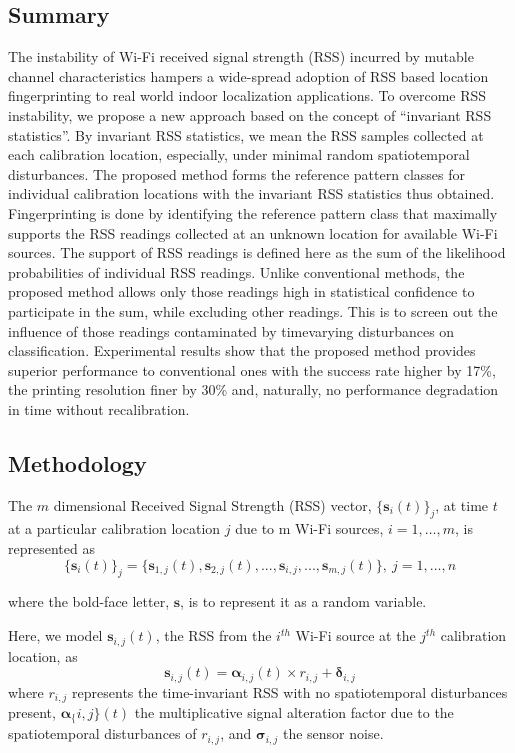 \documentclass{ieeeaccess}
\begin{document}
\subsection{Summary}
The instability of Wi-Fi received signal strength (RSS) incurred
by mutable channel characteristics hampers a wide-spread
adoption of RSS based location fingerprinting to real world indoor
localization applications. To overcome RSS instability, we
propose a new approach based on the concept of “invariant RSS
statistics”. By invariant RSS statistics, we mean the RSS samples
collected at each calibration location, especially, under minimal
random spatiotemporal disturbances. The proposed method\cite{Husen:2016:HPI:2857546.2857589} forms
the reference pattern classes for individual calibration locations
with the invariant RSS statistics thus obtained. Fingerprinting is
done by identifying the reference pattern class that maximally
supports the RSS readings collected at an unknown location for
available Wi-Fi sources. The support of RSS readings is defined
here as the sum of the likelihood probabilities of individual RSS
readings. Unlike conventional methods, the proposed method
allows only those readings high in statistical confidence to
participate in the sum, while excluding other readings. This is to
screen out the influence of those readings contaminated by timevarying disturbances on classification. Experimental results show
that the proposed method provides superior performance to
conventional ones with the success rate higher by 17\%, the
printing resolution finer by 30\% and, naturally, no performance
degradation in time without recalibration.

\subsection{Methodology}
The $m$ dimensional Received Signal Strength (RSS) vector,
$\{\mathbf{s}_i(t)\}_j$, at time $t$ at a particular calibration location $j$ due to m Wi-Fi sources, $i=1, …, m$, is represented as
\begin{equation}
\{\mathbf{s}_i(t)\}_j=\{\mathbf{s}_{1,j}(t), \mathbf{s}_{2,j}(t),...,\mathbf{s}_{i,j},...,\mathbf{s}_{m,j}(t)\},\ j=1,...,n
\end{equation}

where the bold-face letter, $\mathbf{s}$, is to represent it as a random
variable.

Here, we model $\mathbf{s}_{i,j}(t)$, the RSS from the $i^{th}$ Wi-Fi source at the $j^{th}$
calibration location, as
\begin{equation}
\mathbf{s}_{i,j}(t)=\bm{\alpha}_{i,j}(t)\times r_{i,j}+\bm{\delta}_{i,j}
\end{equation}
where $r_{i,j}$ represents the time-invariant RSS with no
spatiotemporal disturbances present, $\bm{\alpha}_\{i,j\}(t)$ the multiplicative
signal alteration factor due to the spatiotemporal disturbances of
$r_{i,j}$, and $\bm{\sigma}_{i,j}$ the sensor noise. 
\end{document}
